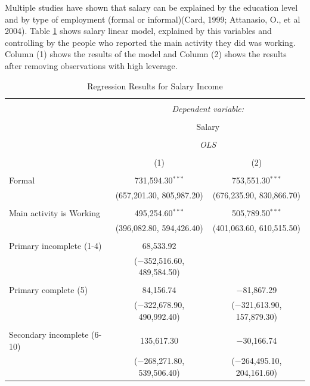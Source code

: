 \documentclass[a4paper,12pt]{article}
\begin{document}
Multiple studies have shown that salary can be explained by the education level and by type of employment (formal or informal)(Card, 1999; Attanasio, O., et al 2004). Table \ref{tab:WAGES2} shows salary linear model, explained by this variables and controlling by the people who reported the main activity they did was working. Column (1) shows the results of the model and Column (2) shows the results after removing observations with high leverage. 

\begin{table}[!htbp] \centering 
  \caption{Regression Results for Salary Income} 
  \label{tab:WAGES2} 
\begin{tabular}{@{\extracolsep{5pt}}lcc} 
\\[-1.8ex]\hline 
\hline \\[-1.8ex] 
 & \multicolumn{2}{c}{\textit{Dependent variable:}} \\ 
\cline{2-3} 
\\[-1.8ex] & \multicolumn{2}{c}{Salary} \\ 
\\[-1.8ex] & \multicolumn{2}{c}{\textit{OLS}} \\ 
\\[-1.8ex] & (1) & (2)\\ 
\hline \\[-1.8ex] 
 Formal & 731,594.30$^{***}$ & 753,551.30$^{***}$ \\ 
  & (657,201.30, 805,987.20) & (676,235.90, 830,866.70) \\ 
  & & \\ 
 Main activity is Working & 495,254.60$^{***}$ & 505,789.50$^{***}$ \\ 
  & (396,082.80, 594,426.40) & (401,063.60, 610,515.50) \\ 
  & & \\ 
 Primary incomplete (1-4) & 68,533.92 &  \\ 
  & ($-$352,516.60, 489,584.50) &  \\ 
  & & \\ 
 Primary complete (5) & 84,156.74 & $-$81,867.29 \\ 
  & ($-$322,678.90, 490,992.40) & ($-$321,613.90, 157,879.30) \\ 
  & & \\ 
 Secondary incomplete (6-10) & 135,617.30 & $-$30,166.74 \\ 
  & ($-$268,271.80, 539,506.40) & ($-$264,495.10, 204,161.60) \\ 

\end{tabular}
\end{table}
\end{document}
